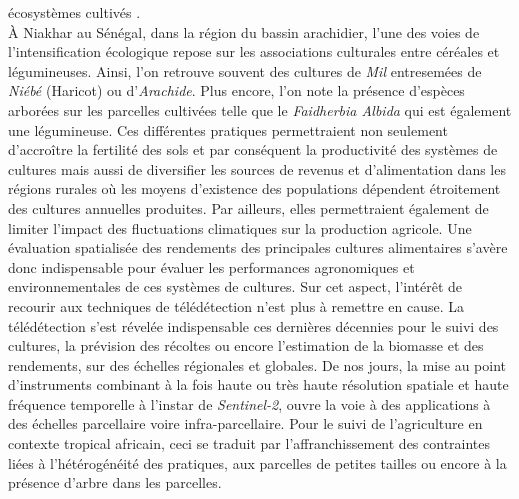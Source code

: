 écosystèmes cultivés \citep{Goulet2012}.\\ \`A Niakhar au Sénégal, dans la région du bassin arachidier, l'une des voies de l'intensification écologique repose sur les associations culturales 
entre céréales et légumineuses. Ainsi, l'on retrouve souvent des cultures de \emph{Mil} entresemées de \emph{Niébé} (Haricot) ou d'\emph{Arachide}. Plus encore, l'on note la 
présence d'espèces arborées sur les parcelles cultivées telle que le \emph{Faidherbia Albida} qui est également une légumineuse. Ces différentes pratiques permettraient non seulement d’accroître la fertilité des 
sols et par conséquent la productivité des systèmes de cultures mais aussi de diversifier les sources de revenus et d’alimentation dans les régions rurales où les moyens d’existence
des populations dépendent étroitement des cultures annuelles produites. Par ailleurs, elles permettraient également de limiter l’impact des fluctuations climatiques sur la 
production agricole. Une évaluation spatialisée des rendements des principales cultures alimentaires s'avère donc indispensable pour évaluer les performances agronomiques et 
environnementales de ces systèmes de cultures. Sur cet aspect, l'intérêt de recourir aux techniques de télédétection n'est plus à remettre en cause. La télédétection s'est révelée 
indispensable ces dernières décennies pour le suivi des cultures, la prévision des récoltes ou encore l'estimation de la biomasse et des rendements, sur des échelles régionales et 
globales. De nos jours, la mise au point d'instruments combinant à la fois haute ou très haute résolution spatiale et haute fréquence temporelle à l'instar de \emph{Sentinel-2}, ouvre la
voie à des applications à des échelles parcellaire voire infra-parcellaire. Pour le suivi de l'agriculture en contexte tropical africain, ceci se traduit par l'affranchissement des contraintes liées à 
l'hétérogénéité des pratiques, aux parcelles de petites tailles ou encore à la présence d’arbre dans les parcelles.